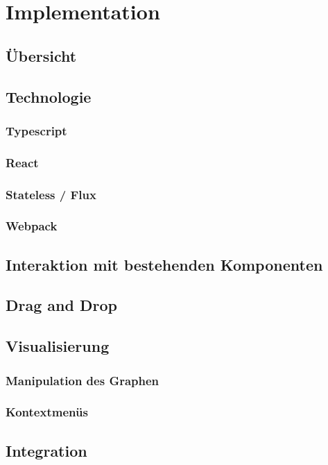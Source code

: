 \chapter{Implementation}
\section{Übersicht}

\section{Technologie}
\label{sec:technologie}

\subsection{Typescript}

\subsection{React}

\subsection{Stateless / Flux}

\subsection{Webpack}


\section{Interaktion mit bestehenden Komponenten}

\section{Drag and Drop}

\section{Visualisierung}

\subsection{Manipulation des Graphen}

\subsection{Kontextmenüs}

\section{Integration}

